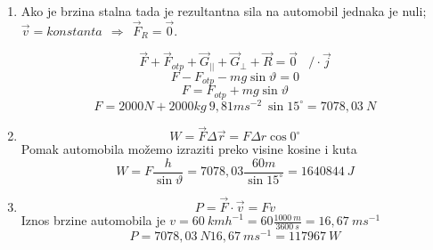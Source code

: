 

\begin{enumerate}[label=\alph*)]
 \item Ako je brzina stalna tada je rezultantna sila na automobil jednaka je nuli; 
$\vec{v}=konstanta    \ \ \Rightarrow \ \ \vec{F}_R=\vec{0}.$

$$ \vec{F} + \vec{F}_{otp} + \vec{G}_{||} + \vec{G}_{\bot} + \vec{R} = \vec{0} \ \ \ \  /\cdot\vec{j} $$
$$ F - F_{otp} - mg\sin\vartheta = 0$$
$$ F = F_{otp} + mg\sin\vartheta  $$
$$ F = 2000N + 2000kg\ 9,81ms^{-2}\ \sin15^\circ = 7078,03\ N $$
 \item  $$ W=\vec{F}\Delta \vec{r}=F\Delta r\cos 0^\circ $$
 Pomak automobila možemo izraziti preko visine kosine i kuta
 $$ W = F\frac{h}{\sin\vartheta} = 7078,03\frac{60m}{\sin15^\circ} = 1640844\ J $$
 \item $$ P = \vec{F}\cdot\vec{v}=Fv $$
Iznos brzine automobila je $ v = 60\ kmh^{-1} = 60\frac{1000\ m}{3600\ s}=16,67\ ms^{-1}$
$$P=7078,03\ N 16,67\ ms^{-1} = 117967\ W$$
\end{enumerate}
